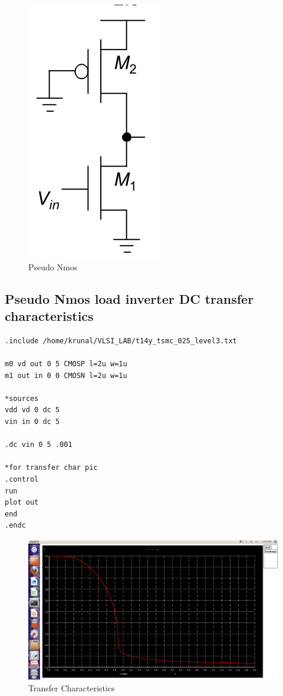 \documentclass[12pt,a4paper]{article}
\begin{document}
\begin{center}
\begin{figure}[!ht]
\centering
\includegraphics[scale=0.6]{pseudo.png}
\caption[Short]{Pseudo Nmos}
\end{figure}
\subsection{Pseudo Nmos load inverter DC transfer characteristics}

\begin{lstlisting}
.include /home/krunal/VLSI_LAB/t14y_tsmc_025_level3.txt

m0 vd out 0 5 CMOSP l=2u w=1u
m1 out in 0 0 CMOSN l=2u w=1u	

*sources
vdd vd 0 dc 5 
vin in 0 dc 5 

.dc vin 0 5 .001

*for transfer char pic
.control
run
plot out
end
.endc

\end{lstlisting}
\begin{figure}[!ht]
\centering
\includegraphics[scale=0.37]{lab3_pic3_1_transfer_char_only.png}
\caption[Short]{Transfer Characteristics}
\end{figure}


\end{center}
\end{document}
